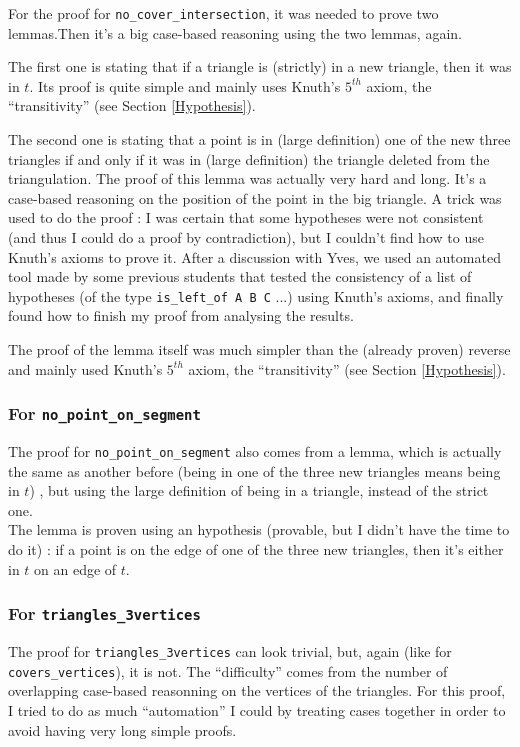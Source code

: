 \documentclass[a4paper,10pt]{article}
\begin{document}
  For the proof for {\tt no\_cover\_intersection}, it was needed to prove two lemmas.Then it's a big case-based reasoning using the two lemmas, again.

  The first one is stating that if a triangle is (strictly) in a new triangle, then it was in $t$.
  Its proof is quite simple and mainly uses Knuth's $5^{th}$ axiom, the ``transitivity'' (see Section \ref{Hypothesis}).
  
  The second one is stating that a point is in (large definition) one of the new three triangles if and only if it was in (large definition) the triangle deleted from the triangulation. The proof of this lemma was actually very hard and long. It's a case-based reasoning on the position of the point in the big triangle. A trick was used to do the proof : I was certain that some hypotheses were not consistent (and thus I could do a proof by contradiction), but I couldn't find how to use Knuth's axioms to prove it. After a discussion with Yves, we used an automated tool made by some previous students that tested the consistency of a list of hypotheses (of the type {\tt is\_left\_of A B C} ...) using Knuth's axioms, and finally found how to finish my proof from analysing the results.

  
  
  The proof of the lemma itself was much simpler than the (already proven) reverse and mainly used Knuth's $5^{th}$ axiom, the ``transitivity'' (see Section \ref{Hypothesis}).
  
  \subsubsection{For {\tt no\_point\_on\_segment}}

  The proof for {\tt no\_point\_on\_segment} also comes from a lemma, which is actually the same as another before (being in one of the three new triangles means being in $t$) , but using the large definition of being in a triangle, instead of the strict one.\\
  The lemma is proven using an hypothesis (provable, but I didn't have the time to do it) : if a point is on the edge of one of the three new triangles, then it's either in $t$ on an edge of $t$.
  
  \subsubsection{For {\tt triangles\_3vertices}}

  The proof for {\tt triangles\_3vertices} can look trivial, but, again (like for {\tt covers\_vertices}), it is not. The ``difficulty'' comes from the number of overlapping case-based reasonning on the vertices of the triangles. For this proof, I tried to do as much ``automation'' I could by treating cases together in order to avoid having very long simple proofs.
  
\end{document}
